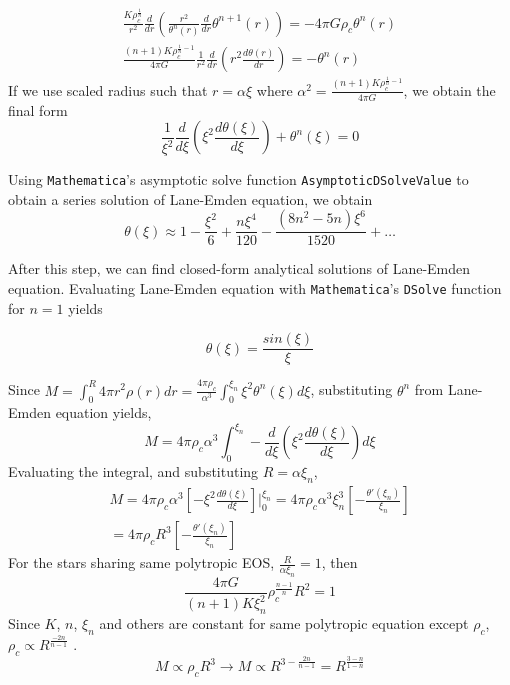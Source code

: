 \documentclass[aps,twocolumn,showpacs,preprintnumbers,nofootinbib,prl,superscriptaddress,groupedaddress]{revtex4-2}
\begin{document}
\begin{align}
	\frac{K\rho_c^{\frac{1}{n}}}{r^2}\frac{d}{dr}(\frac{r^2}{\theta^n(r)}\frac{d}{dr}\theta^{n+1}(r)) = -4\pi G  \rho_c\theta^n(r) \\
	\frac{(n+1)K\rho_c^{\frac{1}{n}-1}}{4\pi G  }\frac{1}{r^2}\frac{d}{dr}(r^2\frac{d\theta(r)}{dr}) = -\theta^n(r)
\end{align}
If we use scaled radius such that $r = \alpha \xi$  where $\alpha^2 = \frac{(n+1)K\rho_c^{\frac{1}{n}-1}}{4\pi G  }$, we obtain the final form
\begin{equation}
	\frac{1}{\xi^2}\frac{d}{d\xi}(\xi^2\frac{d\theta(\xi)}{d\xi}) + \theta^n(\xi) = 0
\end{equation}

Using \texttt{Mathematica}'s asymptotic solve function \texttt{AsymptoticDSolveValue} to obtain a series solution of Lane-Emden equation, we obtain
\begin{equation}
\theta(\xi) \approx 1 - \frac{\xi^2}{6}+\frac{n\xi^4}{120}-\frac{(8n^2-5n)\xi^6}{1520}+\dots
\end{equation}

After this step, we can find closed-form analytical solutions of Lane-Emden equation. Evaluating Lane-Emden equation with \texttt{Mathematica}'s \texttt{DSolve} function for $n=1$ yields

\begin{equation}
	\theta(\xi) = \frac{sin(\xi)}{\xi}
\end{equation}


Since $M = \int_0^R 4\pi r^2\rho(r)dr = \frac{4\pi \rho_c}{\alpha^3}\int_0^{\xi_n} \xi^2\theta^n(\xi)d\xi$, substituting $\theta^n$ from Lane-Emden equation yields,
\begin{equation}
	M = 4\pi \rho_c\alpha^3\int_0^{\xi_n} -\frac{d}{d\xi}(\xi^2\frac{d\theta(\xi)}{d\xi})d\xi
\end{equation}
Evaluating the integral, and substituting $R = \alpha\xi_n$,
\begin{align}\label{eq12,eq13}
&	M = 4\pi \rho_c\alpha^3[-\xi^2\frac{d\theta(\xi)}{d\xi}]\bigg|_0^{\xi_n} = 4\pi \rho_c\alpha^3\xi^3_n[-\frac{\theta'(\xi_n)}{\xi_n}] & \\
	&= 4\pi \rho_cR^3[-\frac{\theta'(\xi_n)}{\xi_n}] & 
\end{align}
For the stars sharing same polytropic EOS, $\frac{R}{\alpha\xi_n}=1$, then
\begin{equation}
	\frac{4\pi G}{(n+1)K \xi_n^2}\rho_c^{\frac{n-1}{n}}R^2 =1
\end{equation}
Since $K$, $n$, $\xi_n$ and others are constant for same polytropic equation except $\rho_c$, $\rho_c \propto R^{\frac{-2n}{n-1}}$ . \\
\begin{equation}
	M \propto \rho_cR^3 \to M \propto R^{3-\frac{2n}{n-1}}=R^{\frac{3-n}{1-n}}
\end{equation}
\end{document}
